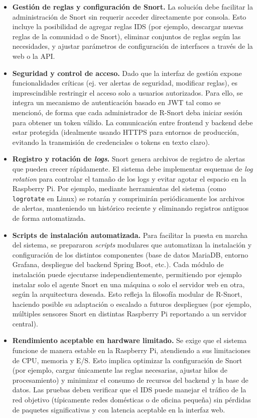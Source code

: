 \documentclass[11pt,a4paper,twoside]{report}
\begin{document}
\begin{itemize}
	\item \textbf{Gestión de reglas y configuración de Snort.} La solución debe facilitar la administración de Snort sin requerir acceder directamente por consola. Esto incluye la posibilidad de agregar reglas IDS (por ejemplo, descargar nuevas reglas de la comunidad o de Snort), eliminar conjuntos de reglas según las necesidades, y ajustar parámetros de configuración de interfaces a través de la web o la API.
	
	\item \textbf{Seguridad y control de acceso.} Dado que la interfaz de gestión expone funcionalidades críticas (ej. ver alertas de seguridad, modificar reglas), es imprescindible restringir el acceso solo a usuarios autorizados. Para ello, se integra un mecanismo de autenticación basado en JWT tal como se mencionó, de forma que cada administrador de R-Snort deba iniciar sesión para obtener un token válido. La comunicación entre frontend y backend debe estar protegida (idealmente usando HTTPS para entornos de producción, evitando la transmisión de credenciales o tokens en texto claro).
	
	\item \textbf{Registro y rotación de \emph{logs}.} Snort genera archivos de registro de alertas que pueden crecer rápidamente. El sistema debe implementar esquemas de \emph{log rotation} para controlar el tamaño de los logs y evitar agotar el espacio en la Raspberry Pi. Por ejemplo, mediante herramientas del sistema (como \texttt{logrotate} en Linux) se rotarán y comprimirán periódicamente los archivos de alertas, manteniendo un histórico reciente y eliminando registros antiguos de forma automatizada.
	
	\item \textbf{Scripts de instalación automatizada.} Para facilitar la puesta en marcha del sistema, se prepararon \emph{scripts} modulares que automatizan la instalación y configuración de los distintos componentes (base de datos MariaDB, entorno Grafana, despliegue del backend Spring Boot, etc.). Cada módulo de instalación puede ejecutarse independientemente, permitiendo por ejemplo instalar solo el agente Snort en una máquina o solo el servidor web en otra, según la arquitectura deseada. Esto refleja la filosofía modular de R-Snort, haciendo posible su adaptación o escalado a futuros despliegues (por ejemplo, múltiples sensores Snort en distintas Raspberry Pi reportando a un servidor central).
	
	\item \textbf{Rendimiento aceptable en hardware limitado.} Se exige que el sistema funcione de manera estable en la Raspberry Pi, atendiendo a sus limitaciones de CPU, memoria y E/S. Esto implica optimizar la configuración de Snort (por ejemplo, cargar únicamente las reglas necesarias, ajustar hilos de procesamiento) y minimizar el consumo de recursos del backend y la base de datos. Las pruebas deben verificar que el IDS puede manejar el tráfico de la red objetivo (típicamente redes domésticas o de oficina pequeña) sin pérdidas de paquetes significativas y con latencia aceptable en la interfaz web.
\end{itemize}
\end{document}
